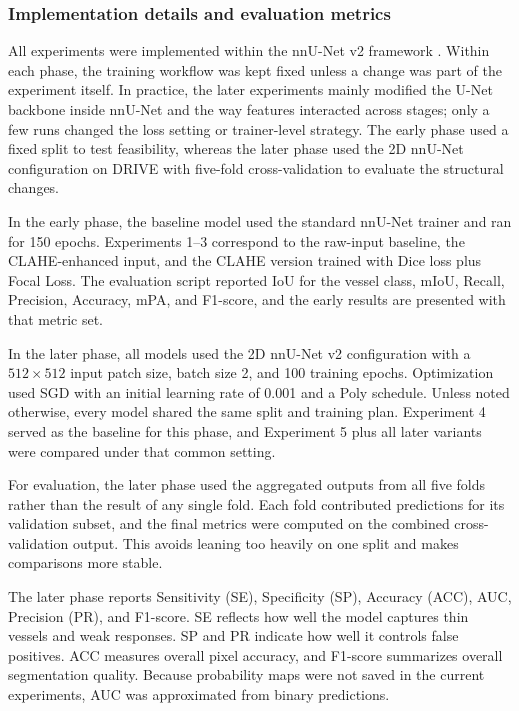 \documentclass[a4paper,12pt]{article}
\begin{document}
\subsubsection{Implementation details and evaluation metrics}

All experiments were implemented within the nnU-Net v2 framework \cite{isensee2021nnunet}. Within each phase, the training workflow was kept fixed unless a change was part of the experiment itself. In practice, the later experiments mainly modified the U-Net backbone inside nnU-Net and the way features interacted across stages; only a few runs changed the loss setting or trainer-level strategy. The early phase used a fixed split to test feasibility, whereas the later phase used the 2D nnU-Net configuration on DRIVE with five-fold cross-validation to evaluate the structural changes.

In the early phase, the baseline model used the standard nnU-Net trainer and ran for 150 epochs. Experiments 1--3 correspond to the raw-input baseline, the CLAHE-enhanced input, and the CLAHE version trained with Dice loss plus Focal Loss. The evaluation script reported IoU for the vessel class, mIoU, Recall, Precision, Accuracy, mPA, and F1-score, and the early results are presented with that metric set.

In the later phase, all models used the 2D nnU-Net v2 configuration with a \(512 \times 512\) input patch size, batch size 2, and 100 training epochs. Optimization used SGD with an initial learning rate of 0.001 and a Poly schedule. Unless noted otherwise, every model shared the same split and training plan. Experiment 4 served as the baseline for this phase, and Experiment 5 plus all later variants were compared under that common setting.

For evaluation, the later phase used the aggregated outputs from all five folds rather than the result of any single fold. Each fold contributed predictions for its validation subset, and the final metrics were computed on the combined cross-validation output. This avoids leaning too heavily on one split and makes comparisons more stable.

The later phase reports Sensitivity (SE), Specificity (SP), Accuracy (ACC), AUC, Precision (PR), and F1-score. SE reflects how well the model captures thin vessels and weak responses. SP and PR indicate how well it controls false positives. ACC measures overall pixel accuracy, and F1-score summarizes overall segmentation quality. Because probability maps were not saved in the current experiments, AUC was approximated from binary predictions.
\end{document}
